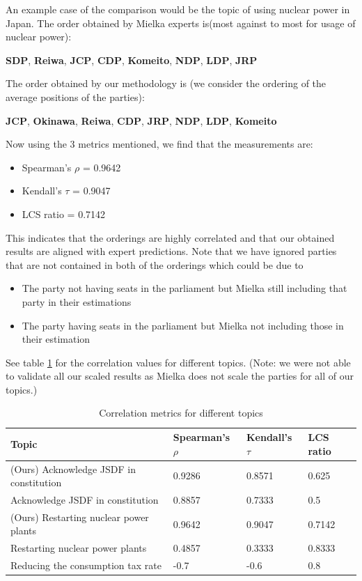 \documentclass[final,5p,times,twocolumn,authoryear]{elsarticle}
\begin{document}
An example case of the comparison would be the topic of using nuclear power in Japan. The order obtained by Mielka experts is(most against to most for usage of nuclear power):
\begin{center}
\textbf{SDP}, \textbf{Reiwa}, \textbf{JCP}, \textbf{CDP}, \textbf{Komeito}, \textbf{NDP}, \textbf{LDP}, \textbf{JRP}
\end{center}

The order obtained by our methodology is (we consider the ordering of the average positions of the parties):

\begin{center}
	\textbf{JCP}, \textbf{Okinawa}, \textbf{Reiwa}, \textbf{CDP}, \textbf{JRP}, \textbf{NDP}, \textbf{LDP}, \textbf{Komeito}
\end{center}

Now using the 3 metrics mentioned, we find that the measurements are:
\begin{itemize}
	\item Spearman's $\rho$ = 0.9642
	\item Kendall's $\tau$ = 0.9047
	\item LCS ratio = 0.7142
\end{itemize} 
This indicates that the orderings are highly correlated and that our obtained results are aligned with expert predictions. 
Note that we have ignored parties that are not contained in both of the orderings which could be due to 
\begin{itemize}
	\item The party not having seats in the parliament but Mielka still including that party in their estimations
	\item The party having seats in the parliament but Mielka not including those in their estimation
\end{itemize}

See table \ref{table:spearman} for the correlation values for different topics. (Note: we were not able to validate all our scaled results as Mielka does not scale the parties for all of our topics.)

\begin{table}[h]
\centering
\begin{tabularx}{\columnwidth}{|X|X|X|X|}
\hline
\textbf{Topic} & \textbf{Spearman's $\rho$}& \textbf{Kendall's $\tau$} &\textbf{LCS ratio}\\ \hline
(Ours) Acknowledge JSDF in constitution & 0.9286 & 0.8571& 0.625\\ \hline
\citep{kato2024lupinllmbasedpoliticalideology} Acknowledge JSDF in constitution & 0.8857 & 0.7333& 0.5\\ \hline
(Ours) Restarting nuclear power plants & 0.9642 & 0.9047& 0.7142\\ \hline
\citep{kato2024lupinllmbasedpoliticalideology} Restarting nuclear power plants & 0.4857 & 0.3333& 0.8333\\ \hline

Reducing the consumption tax rate & -0.7 & -0.6 & 0.8\\ \hline
\end{tabularx}
\caption{Correlation metrics for different topics}
\label{table:spearman}
\end{table}
\end{document}
